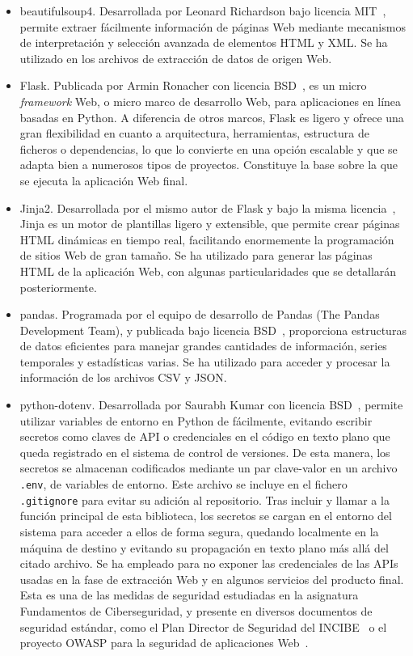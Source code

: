 \begin{itemize}
    \item beautifulsoup4. Desarrollada por Leonard Richardson bajo licencia MIT~\cite{beautifulsoup4}, permite extraer fácilmente información de páginas Web mediante mecanismos de interpretación y selección avanzada de elementos HTML y XML. Se ha utilizado en los archivos de extracción de datos de origen Web.
    \item Flask. Publicada por Armin Ronacher con licencia BSD~\cite{flask}, es un micro \textit{framework} Web, o micro marco de desarrollo Web, para aplicaciones en línea basadas en Python. A diferencia de otros marcos, Flask es ligero y ofrece una gran flexibilidad en cuanto a arquitectura, herramientas, estructura de ficheros o dependencias, lo que lo convierte en una opción escalable y que se adapta bien a numerosos tipos de proyectos. Constituye la base sobre la que se ejecuta la aplicación Web final.
    \item Jinja2. Desarrollada por el mismo autor de Flask y bajo la misma licencia~\cite{jinja2}, Jinja es un motor de plantillas ligero y extensible, que permite crear páginas HTML dinámicas en tiempo real, facilitando enormemente la programación de sitios Web de gran tamaño. Se ha utilizado para generar las páginas HTML de la aplicación Web, con algunas particularidades que se detallarán posteriormente.
    \item pandas. Programada por el equipo de desarrollo de Pandas (\guillemotleft The Pandas Development Team\guillemotright), y publicada bajo licencia BSD~\cite{pandas}, proporciona estructuras de datos eficientes para manejar grandes cantidades de información, series temporales y estadísticas varias. Se ha utilizado para acceder y procesar la información de los archivos CSV y JSON.
    \item python-dotenv. Desarrollada por Saurabh Kumar con licencia BSD~\cite{py_dotenv}, permite utilizar variables de entorno en Python de fácilmente, evitando escribir secretos como claves de API o credenciales en el código en texto plano que queda registrado en el sistema de control de versiones. De esta manera, los secretos se almacenan codificados mediante un par clave-valor en un archivo \texttt{.env}, de variables de entorno. Este archivo se incluye en el fichero \texttt{.gitignore} para evitar su adición al repositorio. Tras incluir y llamar a la función principal de esta biblioteca, los secretos se cargan en el entorno del sistema para acceder a ellos de forma segura, quedando localmente en la máquina de destino y evitando su propagación en texto plano más allá del citado archivo. Se ha empleado para no exponer las credenciales de las APIs usadas en la fase de extracción Web y en algunos servicios del producto final. Esta es una de las medidas de seguridad estudiadas en la asignatura \guillemotleft Fundamentos de Ciberseguridad\guillemotright, y presente en diversos documentos de seguridad estándar, como el Plan Director de Seguridad del INCIBE~\cite{INCIBE} o el proyecto OWASP para la seguridad de aplicaciones Web~\cite{OWASP}.

\end{itemize}
